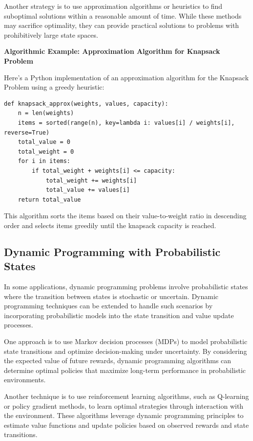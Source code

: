 \documentclass[12pt]{book} %
\begin{document}
Another strategy is to use approximation algorithms or heuristics to find suboptimal solutions within a reasonable amount of time. While these methods may sacrifice optimality, they can provide practical solutions to problems with prohibitively large state spaces.

\textbf{Algorithmic Example: Approximation Algorithm for Knapsack Problem}

Here's a Python implementation of an approximation algorithm for the Knapsack Problem using a greedy heuristic:
\FloatBarrier
\begin{verbatim}
def knapsack_approx(weights, values, capacity):
    n = len(weights)
    items = sorted(range(n), key=lambda i: values[i] / weights[i], reverse=True)
    total_value = 0
    total_weight = 0
    for i in items:
        if total_weight + weights[i] <= capacity:
            total_weight += weights[i]
            total_value += values[i]
    return total_value
\end{verbatim}

This algorithm sorts the items based on their value-to-weight ratio in descending order and selects items greedily until the knapsack capacity is reached.

\subsection{Dynamic Programming with Probabilistic States}

In some applications, dynamic programming problems involve probabilistic states where the transition between states is stochastic or uncertain. Dynamic programming techniques can be extended to handle such scenarios by incorporating probabilistic models into the state transition and value update processes.

One approach is to use Markov decision processes (MDPs) to model probabilistic state transitions and optimize decision-making under uncertainty. By considering the expected value of future rewards, dynamic programming algorithms can determine optimal policies that maximize long-term performance in probabilistic environments.

Another technique is to use reinforcement learning algorithms, such as Q-learning or policy gradient methods, to learn optimal strategies through interaction with the environment. These algorithms leverage dynamic programming principles to estimate value functions and update policies based on observed rewards and state transitions.
\end{document}
